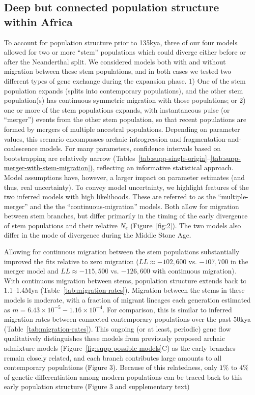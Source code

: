 \documentclass[]{article}
\begin{document}
\subsection*{Deep but connected population structure within Africa}

To account for population structure prior to 135kya, three of our four models allowed for two or more
“stem” populations which could diverge either before or after the Neanderthal
split. We considered models both with and without migration between these stem
populations, and in both cases we tested two different types of gene exchange
during the expansion phase. 1) One of the stem population expands (splits into
contemporary populations), and the other stem population(s) has continuous
symmetric migration with those populations; or 2) one or more of the stem
populations expands, with instantaneous pulse (or “merger”) events from the
other stem population, so that recent populations are formed by mergers of multiple ancestral populations. Depending on parameter values,
this scenario encompasses archaic introgression and
fragmentation-and-coalescence models. For many parameters, confidence intervals based on bootstrapping are relatively narrow
(Tables~\ref{tab:supp-single-origin}--\ref{tab:supp-merger-with-stem-migration}),
reflecting an informative statistical approach. Model assumptions
have, however, a larger impact on parameter estimates (and thus, real uncertainty). To convey model uncertainty, we
highlight features of the two inferred models with high likelihoods. These are referred to as the
“multiple-merger” and the the “continuous-migration” models. Both allow for
migration between stem branches, but differ primarily in the timing of the
early divergence of stem populations and their relative $N_e$
(Figure~\ref{fig:2}). The two models also differ in the mode of divergence
during the Middle Stone Age.

Allowing for continuous migration between the stem populations substantially
improved the fits relative to zero migration ($LL \approx -102,600$ vs.
$-107,700$ in the merger model and $LL \approx -115,500$ vs. $-126,600$ with
continuous migration). With continuous migration between stems, population
structure extends back to 1.1--1.4Mya (Table~\ref{tab:migration-rates}).
Migration between the stems in these models is moderate, with a fraction of
migrant lineages each generation estimated as
$m=6.43\times10^{-5}-1.16\times10^{-4}$. For comparison, this is similar
to inferred migration rates between connected contemporary populations over the
past 50kya (Table~\ref{tab:migration-rates}). This ongoing (or at least,
periodic) gene flow qualitatively distinguishes these models from previously
proposed archaic admixture models (Figure~\ref{fig:supp-possible-models}C) as
the early branches remain closely related, and each branch contributes large amounts to all contemporary populations (Figure 3). 
Because of this 
relatedness, only $1\%$ to $4\%$ of genetic differentiation among modern populations can be traced back
to this early population structure (Figure 3 and supplementary text)
 
\end{document}
